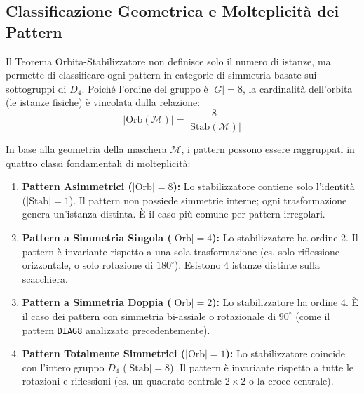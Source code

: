 \subsection{Classificazione Geometrica e Molteplicità dei Pattern}

Il Teorema Orbita-Stabilizzatore non definisce solo il numero di istanze, ma permette di classificare ogni pattern in categorie di simmetria basate sui sottogruppi di $D_4$. Poiché l'ordine del gruppo è $|G|=8$, la cardinalità dell'orbita (le istanze fisiche) è vincolata dalla relazione:
\begin{equation}
    |\text{Orb}(\mathcal{M})| = \frac{8}{|\text{Stab}(\mathcal{M})|}
\end{equation}

In base alla geometria della maschera $\mathcal{M}$, i pattern possono essere raggruppati in quattro classi fondamentali di molteplicità:

\begin{enumerate}
    \item \textbf{Pattern Asimmetrici ($|\text{Orb}|=8$):} Lo stabilizzatore contiene solo l'identità ($|\text{Stab}|=1$). Il pattern non possiede simmetrie interne; ogni trasformazione genera un'istanza distinta. È il caso più comune per pattern irregolari.

    \item \textbf{Pattern a Simmetria Singola ($|\text{Orb}|=4$):} Lo stabilizzatore ha ordine 2. Il pattern è invariante rispetto a una sola trasformazione (es. solo riflessione orizzontale, o solo rotazione di $180^\circ$). Esistono 4 istanze distinte sulla scacchiera.

    \item \textbf{Pattern a Simmetria Doppia ($|\text{Orb}|=2$):} Lo stabilizzatore ha ordine 4. È il caso dei pattern con simmetria bi-assiale o rotazionale di $90^\circ$ (come il pattern \texttt{DIAG8} analizzato precedentemente).

    \item \textbf{Pattern Totalmente Simmetrici ($|\text{Orb}|=1$):} Lo stabilizzatore coincide con l'intero gruppo $D_4$ ($|\text{Stab}|=8$). Il pattern è invariante rispetto a tutte le rotazioni e riflessioni (es. un quadrato centrale $2\times2$ o la croce centrale).
\end{enumerate}

